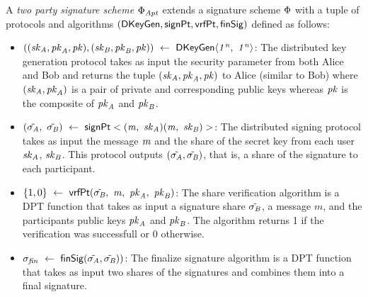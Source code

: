     \begin{definition}
    \label{def:twoPartySig}
    
    A \emph{two party signature scheme $\Phi_{\mathit{Apt}}$} extends a signature scheme $\Phi$ with a tuple of protocols and algorithms $(\mathsf{DKeyGen},  \mathsf{signPt}, \mathsf{vrfPt}, \mathsf{finSig})$ defined as follows: 
    
    \begin{itemize}
    	\item $((\mathit{sk}_{\mathit{A}}, \mathit{pk}_{\mathit{A}}, \mathit{pk}), (\mathit{sk}_{\mathit{B}}, \mathit{pk}_{\mathit{B}}, \mathit{pk})) ~\leftarrow~ \mathsf{DKeyGen}\langle \mathit{1^n} ,~ \mathit{1^n} \rangle$: The distributed key generation protocol takes as input the security parameter from both Alice and Bob and returns the tuple $(\mathit{sk}_{\mathit{A}}, \mathit{pk}_{\mathit{A}}, \mathit{pk})$ to Alice (similar to Bob) where $(\mathit{sk}_{\mathit{A}}, \mathit{pk}_{\mathit{A}})$ is a pair of private and corresponding public keys whereas $\mathit{pk}$ is the composite of $\mathit{pk}_{\mathit{A}}$ and $\mathit{pk}_{\mathit{B}}$. 
    	
    	\item $(\tilde{\sigma_{\mathit{A}}} ,~ \tilde{\sigma_{\mathit{B}}}) ~\leftarrow~ \mathsf{signPt}<(\mathit{m} ,~ \mathit{sk}_{\mathit{A}})(\mathit{m} ,~ \mathit{sk}_{\mathit{B}})>$: The distributed signing protocol takes as input the message $\mathit{m}$ and the share of the secret key from each user $\mathit{sk}_{\mathit{A}}$, $\mathit{sk}_{\mathit{B}}$. This protocol outputs $(\tilde{\sigma_{\mathit{A}}}, \tilde{\sigma_{\mathit{B}}})$, that is, a share of the signature to each participant.  
    	
    	\item $\{1,0\} ~\leftarrow~ \mathsf{vrfPt}(\tilde{\sigma_{\mathit{B}}} ,~ \mathit{m} ,~ \mathit{pk}_{\mathit{A}} ,~ \mathit{pk}_{\mathit{B}})$:  The share verification algorithm is a DPT function that takes as input a signature share $\tilde{\sigma_{\mathit{B}}}$, a message $m$, and the participants public keys $\mathit{pk}_{\mathit{A}}$ and $\mathit{pk}_{\mathit{B}}$. The algorithm returns 1 if the verification was successfull or 0 otherwise.
        \item $\sigma_{\mathit{fin}} ~\leftarrow~ \mathsf{finSig}(\tilde{\sigma_{\mathit{A}}},\tilde{\sigma_{\mathit{B}}}))$: The finalize signature algorithm is a DPT function that takes as input two shares of the  signatures and combines them into a final signature.

    \end{itemize}
    
    \end{definition}
    
    
